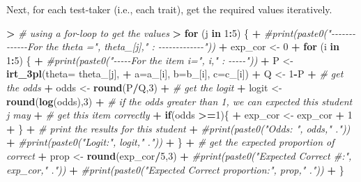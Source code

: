 \documentclass[
]{article}
\newenvironment{Shaded}{\begin{snugshade}}{\end{snugshade}}
\newcommand{\AttributeTok}[1]{\textcolor[rgb]{0.13,0.29,0.53}{#1}}
\newcommand{\CommentTok}[1]{\textcolor[rgb]{0.56,0.35,0.01}{\textit{#1}}}
\newcommand{\ControlFlowTok}[1]{\textcolor[rgb]{0.13,0.29,0.53}{\textbf{#1}}}
\newcommand{\DecValTok}[1]{\textcolor[rgb]{0.00,0.00,0.81}{#1}}
\newcommand{\ErrorTok}[1]{\textcolor[rgb]{0.64,0.00,0.00}{\textbf{#1}}}
\newcommand{\FunctionTok}[1]{\textcolor[rgb]{0.13,0.29,0.53}{\textbf{#1}}}
\newcommand{\NormalTok}[1]{#1}
\newcommand{\OtherTok}[1]{\textcolor[rgb]{0.56,0.35,0.01}{#1}}
\newcommand{\SpecialCharTok}[1]{\textcolor[rgb]{0.81,0.36,0.00}{\textbf{#1}}}
\begin{document}
Next, for each test-taker (i.e., each trait), get the required values
iteratively.

\begin{Shaded}
\begin{Highlighting}[]
\SpecialCharTok{\textgreater{}} \CommentTok{\# using a for{-}loop to get the values}
\ErrorTok{\textgreater{}} \ControlFlowTok{for}\NormalTok{ (j }\ControlFlowTok{in} \DecValTok{1}\SpecialCharTok{:}\DecValTok{5}\NormalTok{) \{}
\SpecialCharTok{+}   \CommentTok{\#print(paste0("{-}{-}{-}{-}{-}{-}{-}{-}{-}{-}{-}{-}{-}For the theta =", theta\_[j]," : {-}{-}{-}{-}{-}{-}{-}{-}{-}{-}{-}{-}{-}"))}
\SpecialCharTok{+}\NormalTok{   exp\_cor }\OtherTok{\textless{}{-}} \DecValTok{0}
\SpecialCharTok{+}   \ControlFlowTok{for}\NormalTok{ (i }\ControlFlowTok{in} \DecValTok{1}\SpecialCharTok{:}\DecValTok{5}\NormalTok{) \{}
\SpecialCharTok{+}     \CommentTok{\#print(paste0("{-}{-}{-}{-}{-}For the item i=", i," : {-}{-}{-}{-}{-}"))}
\SpecialCharTok{+}\NormalTok{     P }\OtherTok{\textless{}{-}} \FunctionTok{irt\_3pl}\NormalTok{(}\AttributeTok{theta=}\NormalTok{ theta\_[j], }
\SpecialCharTok{+}                  \AttributeTok{a=}\NormalTok{a\_[i], }\AttributeTok{b=}\NormalTok{b\_[i], }\AttributeTok{c=}\NormalTok{c\_[i])}
\SpecialCharTok{+}\NormalTok{     Q }\OtherTok{\textless{}{-}} \DecValTok{1}\SpecialCharTok{{-}}\NormalTok{P}
\SpecialCharTok{+}     \CommentTok{\# get the odds}
\SpecialCharTok{+}\NormalTok{     odds }\OtherTok{\textless{}{-}} \FunctionTok{round}\NormalTok{(P}\SpecialCharTok{/}\NormalTok{Q,}\DecValTok{3}\NormalTok{)}
\SpecialCharTok{+}     \CommentTok{\# get the logit}
\SpecialCharTok{+}\NormalTok{     logit }\OtherTok{\textless{}{-}} \FunctionTok{round}\NormalTok{(}\FunctionTok{log}\NormalTok{(odds),}\DecValTok{3}\NormalTok{)    }
\SpecialCharTok{+}     \CommentTok{\# if the odds greater than 1, we can expected this student j may}
\SpecialCharTok{+}     \CommentTok{\# get this item correctly}
\SpecialCharTok{+}     \ControlFlowTok{if}\NormalTok{(odds }\SpecialCharTok{\textgreater{}=}\DecValTok{1}\NormalTok{)\{}
\SpecialCharTok{+}\NormalTok{       exp\_cor }\OtherTok{\textless{}{-}}\NormalTok{ exp\_cor }\SpecialCharTok{+} \DecValTok{1}
\SpecialCharTok{+}\NormalTok{     \}}
\SpecialCharTok{+}     \CommentTok{\# print the results for this student}
\SpecialCharTok{+}     \CommentTok{\#print(paste0("Odds: ", odds," ."))}
\SpecialCharTok{+}     \CommentTok{\#print(paste0("Logit:", logit," ."))}
\SpecialCharTok{+}\NormalTok{   \}}
\SpecialCharTok{+}   \CommentTok{\# get the expected proportion of correct}
\SpecialCharTok{+}\NormalTok{   prop }\OtherTok{\textless{}{-}} \FunctionTok{round}\NormalTok{(exp\_cor}\SpecialCharTok{/}\DecValTok{5}\NormalTok{,}\DecValTok{3}\NormalTok{)}
\SpecialCharTok{+}   \CommentTok{\#print(paste0("Expected Correct \#:", exp\_cor," ."))}
\SpecialCharTok{+}   \CommentTok{\#print(paste0("Expected Correct proportion:", prop," ."))}
\SpecialCharTok{+}\NormalTok{ \}}
\end{Highlighting}
\end{Shaded}
\end{document}
